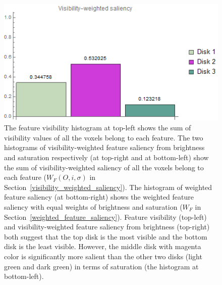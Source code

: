 \begin{figure}
\begin{minipage}{.45\textwidth}
	\end{minipage}~
	\begin{minipage}{.45\textwidth}
		\includegraphics[width=1\linewidth]{images/disk_visibility_saliency_weighted_chart_left.png}
	\end{minipage}
	\caption{The feature visibility \cite{wang_efficient_2011} histogram at top-left shows the sum of visibility values of all the voxels belong to each feature.
		The two histograms of visibility-weighted feature saliency from brightness and saturation respectively (at top-right and at bottom-left) show the sum of visibility-weighted saliency of all the voxels belong to each feature ($ W_{F}(O,i,\sigma) $ in Section~\ref{visibility_weighted_saliency}).
		The histogram of weighted feature saliency (at bottom-right) shows the weighted feature saliency with equal weights of brightness and saturation ($ W_{F} $ in Section~\ref{weighted_feature_saliency}).
		Feature visibility (top-left) and visibility-weighted feature saliency from brightness (top-right) both suggest that the top disk is the most visible and the bottom disk is the least visible.
		However, the middle disk with magenta color is significantly more salient than the other two disks (light green and dark green) in terms of saturation (the histogram at bottom-left).
	}
	\label{fig:disks_saliency_chart_left}
\end{figure}

